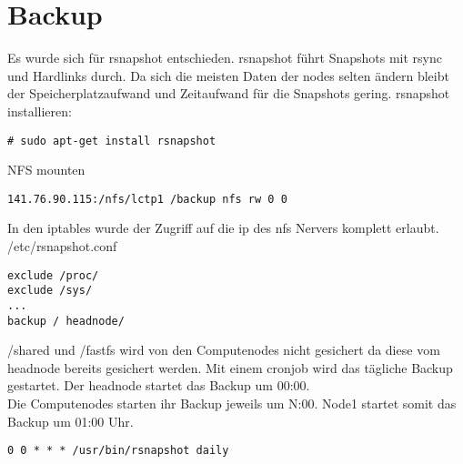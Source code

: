 \chapter{Backup}
Es wurde sich für rsnapshot entschieden. rsnapshot führt Snapshots mit rsync und Hardlinks durch.
Da sich die meisten Daten der nodes selten ändern bleibt der Speicherplatzaufwand und Zeitaufwand für die Snapshots gering.
rsnapshot installieren:
\begin{lstlisting}[style=Bash]
# sudo apt-get install rsnapshot
\end{lstlisting}
NFS mounten
\begin{lstlisting}[style=Bash]
141.76.90.115:/nfs/lctp1 /backup nfs rw 0 0 
\end{lstlisting}
In den iptables wurde der Zugriff auf die ip des nfs Nervers komplett erlaubt.
/etc/rsnapshot.conf
\begin{lstlisting}[style=Bash]
exclude /proc/
exclude /sys/
...
backup / headnode/
\end{lstlisting}
/shared und /fastfs wird von den Computenodes nicht gesichert da diese vom headnode bereits gesichert werden.
Mit einem cronjob wird das tägliche Backup gestartet. Der headnode startet das Backup um 00:00. \\
Die Computenodes starten ihr Backup jeweils um N:00. Node1 startet somit das Backup um 01:00 Uhr.
\begin{lstlisting}[style=Bash]
0 0 * * * /usr/bin/rsnapshot daily
\end{lstlisting}
